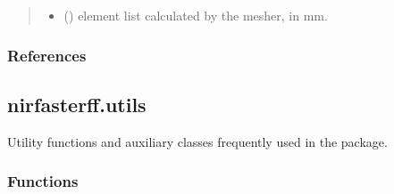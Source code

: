 \documentclass[letterpaper,10pt,english]{sphinxmanual}
\begin{document}
\begin{fulllineitems}
\begin{quote}
\begin{description}
\begin{itemize}
\item {} 
\sphinxAtStartPar
{} () \textendash{} element list calculated by the mesher, in mm.

\end{itemize}


\end{description}\end{quote}
\subsubsection*{References}

\sphinxAtStartPar
{}

\end{fulllineitems}


\sphinxstepscope


\subsection{nirfasterff.utils}
\label{\detokenize{_autosummary/nirfasterff.utils:module-nirfasterff.utils}}\label{\detokenize{_autosummary/nirfasterff.utils:nirfasterff-utils}}\label{\detokenize{_autosummary/nirfasterff.utils::doc}}
\sphinxAtStartPar
Utility functions and auxiliary classes frequently used in the package.
\subsubsection*{Functions}
\end{document}
